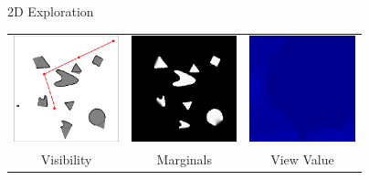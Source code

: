 \addtocounter{framenumber}{-1}
\begin{tframe}{2D Exploration}
\begin{center}

\bigskip
\begin{tabular}{ccc}
\includegraphics[width=1.2in]{media_exploration/2D_scene_04}&
\includegraphics[width=1.2in]{media_exploration/2D_marginal_04}&
\includegraphics[width=1.2in]{media_exploration/2D_energy_04}
\\ Visibility & Marginals & View Value
\end{tabular}
\end{center}
\end{tframe}


